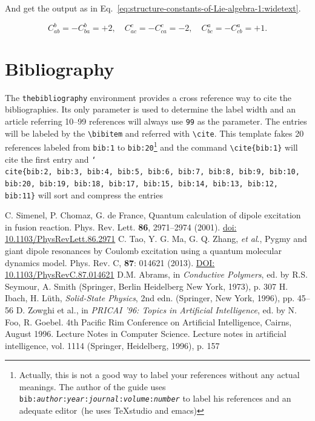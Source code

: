\documentclass[submitting]{nst}
\begin{document}
And get the output as in Eq.~\eqref{eq:structure-constants-of-Lie-algebra-1:widetext}. 

\begin{widetext}
\begin{equation}\label{eq:structure-constants-of-Lie-algebra-1:widetext}
C_{ab}^b = -C_{ba}^b = +2, \quad C_{ac}^c = -C_{ca}^c = -2, \quad C_{bc}^a = -C_{cb}^a = +1 .
\end{equation}
\end{widetext}


\section{Bibliography}

The \verb|thebibliography| environment provides a cross reference way to cite the bibliographies. Its only parameter is used to determine the label width and an article referring 10--99 references will always use \verb|99| as the parameter. The entries will be labeled by the \verb|\bibitem| and referred with \verb|\cite|. This template fakes 20 references labeled from \verb|bib:1| to \verb|bib:20|\footnote{Actually, this is not a good way to label your references without any actual meanings. The author of the guide uses \texttt{bib:\textit{author}:\textit{year}:\textit{journal}:\textit{volume}:\textit{number}} to label his references and an adequate editor~(he uses TeXstudio and emacs)} and the command \verb|\cite{bib:1}| will cite the first entry\cite{bib:1} and \texttt{\char`\\cite\{bib:2, bib:3, bib:4, bib:5, bib:6, bib:7, bib:8, bib:9, bib:10, bib:20, bib:19, bib:18, bib:17, bib:15, bib:14, bib:13, bib:12, bib:11\}} will sort and compress the entries\cite{bib:2, bib:3, bib:4, bib:5}


\begin{thebibliography}{99}
 C. Simenel, P. Chomaz, G. de France, Quantum calculation of dipole excitation in fusion reaction. Phys. Rev. Lett. {\bf 86}, 2971--2974 (2001). \href{http://dx.doi.org/10.1103/PhysRevLett.86.2971}{doi: 10.1103/PhysRevLett.86.2971}
 C. Tao, Y. G. Ma, G. Q. Zhang, \emph{et al}., Pygmy and giant dipole resonances by Coulomb excitation using a quantum molecular dynamics model. Phys. Rev. C, {\bf 87}: 014621 (2013). \href{http://dx.doi.org/10.1103/PhysRevC.87.014621}{DOI: 10.1103/PhysRevC.87.014621} 
 D.M. Abrams, in {\it Conductive Polymers}, ed. by R.S. Seymour, A. Smith (Springer, Berlin Heidelberg New York, 1973), p. 307 
 H. Ibach, H. Lüth, {\it Solid-State Physics}, 2nd edn. (Springer, New York, 1996), pp. 45–56 
 D. Zowghi et al., in {\it PRICAI '96: Topics in Artificial Intelligence}, ed. by N. Foo, R. Goebel. 4th Pacific Rim Conference on Artificial Intelligence, Cairns, August 1996. Lecture Notes in Computer Science. Lecture notes in artificial intelligence, vol. 1114 (Springer, Heidelberg, 1996), p. 157 
\end{thebibliography}
\end{document}
